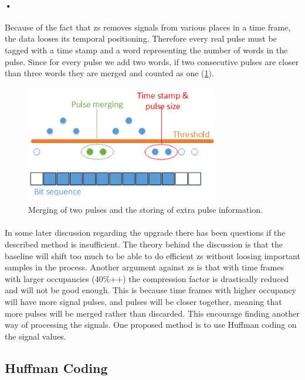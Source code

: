 \documentclass[a4paper, 12pt]{report}
\begin{document}
\paragraph{•}
Because of the fact that \gls{zs} removes signals from various places in a time frame, the data looses its temporal positioning.
Therefore every real pulse must be tagged with a time stamp and a word representing the number of words in the pulse.
Since for every pulse we add two words, if two consecutive pulses are closer than three words they are merged and counted as one (\ref{fig:merge}).

\begin{figure}[h!]
	\centering
		\includegraphics[width=0.75\textwidth]{images/merge.png}
		\caption{Merging of two pulses and the storing of extra pulse information.}
		\label{fig:merge}
\end{figure}

\paragraph{}
In some later discussion regarding the upgrade there has been questions if the described method is insufficient.
The theory behind the discussion is that the baseline will shift too much to be able to do efficient \gls{zs} without loosing important samples in the process.
Another argument against \gls{zs} is that with time frames with larger occupancies (40\%++) the compression factor is drastically reduced and will not be good enough.
This is because time frames with higher occupancy will have more signal pulses, and pulses will be closer together, meaning that more pulses will be merged rather than discarded. 
This encourage finding another way of processing the signals.
One proposed method is to use Huffman coding on the signal values.

\subsection{Huffman Coding} %
\end{document}
